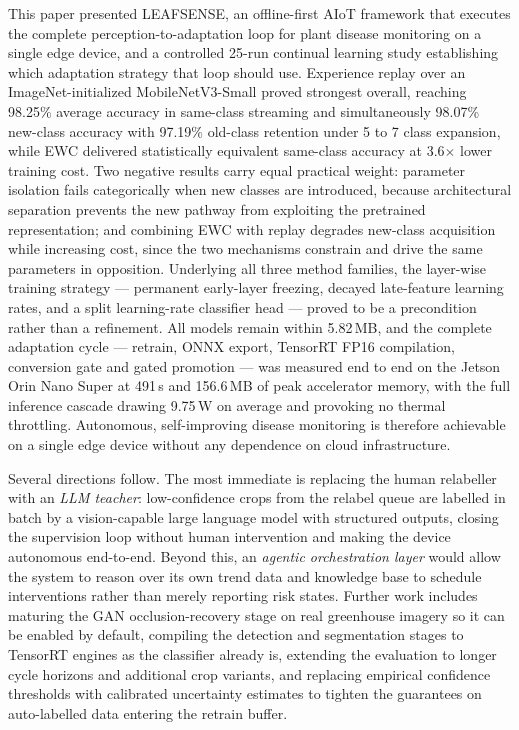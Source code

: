 \documentclass[journal]{IEEEtran}
\begin{document}
This paper presented LEAFSENSE, an offline-first AIoT framework that executes the
complete perception-to-adaptation loop for plant disease monitoring on a single edge
device, and a controlled 25-run continual learning study establishing which
adaptation strategy that loop should use. Experience replay over an
ImageNet-initialized MobileNetV3-Small proved strongest overall, reaching 98.25\%
average accuracy in same-class streaming and simultaneously 98.07\% new-class
accuracy with 97.19\% old-class retention under 5 to 7 class expansion,
while EWC delivered statistically equivalent same-class accuracy at 3.6$\times$ lower
training cost. Two negative results carry equal practical weight: parameter isolation
fails categorically when new classes are introduced, because architectural separation
prevents the new pathway from exploiting the pretrained representation; and combining
EWC with replay degrades new-class acquisition while increasing cost, since the two
mechanisms constrain and drive the same parameters in opposition. Underlying all
three method families, the layer-wise training strategy --- permanent early-layer
freezing, decayed late-feature learning rates, and a split learning-rate classifier
head --- proved to be a precondition rather than a refinement. All models remain
within 5.82\,MB, and the complete adaptation cycle --- retrain, ONNX export,
TensorRT FP16 compilation, conversion gate and gated promotion --- was measured end
to end on the Jetson Orin Nano Super at 491\,s and 156.6\,MB of peak accelerator
memory, with the full inference cascade drawing 9.75\,W on average and provoking no
thermal throttling. Autonomous, self-improving disease monitoring is therefore
achievable on a single edge device without any dependence on cloud infrastructure.

Several directions follow. The most immediate is replacing the human relabeller with
an \emph{LLM teacher}: low-confidence crops from the relabel queue are labelled in
batch by a vision-capable large language model with structured outputs, closing the
supervision loop without human intervention and making the device autonomous
end-to-end. Beyond this, an \emph{agentic orchestration layer} would allow the system
to reason over its own trend data and knowledge base to schedule interventions rather
than merely reporting risk states. Further work includes maturing the GAN
occlusion-recovery stage on real greenhouse imagery so it can be enabled by default,
compiling the detection and segmentation stages to TensorRT engines as the
classifier already is, extending the evaluation to longer cycle horizons and
additional crop variants, and replacing empirical confidence thresholds with
calibrated uncertainty estimates to tighten the guarantees on auto-labelled data
entering the retrain buffer.
\end{document}
